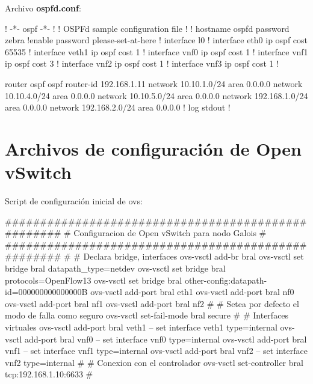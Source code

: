 \newpage
Archivo \textbf{ospfd.conf}:
\begin{bash}
! -*- ospf -*-
!
! OSPFd sample configuration file
!
!
hostname ospfd
password zebra
!enable password please-set-at-here
!
interface l0
!
interface eth0
  ip ospf cost 65535
!
interface veth1
 ip ospf cost 1
!
interface vnf0
  ip ospf cost 1
!
interface vnf1
  ip ospf cost 3
!
interface vnf2
  ip ospf cost 1
!
interface vnf3
  ip ospf cost 1
!

router ospf
 ospf router-id 192.168.1.11
 network 10.10.1.0/24 area 0.0.0.0
 network 10.10.4.0/24 area 0.0.0.0
 network 10.10.5.0/24 area 0.0.0.0
 network 192.168.1.0/24 area 0.0.0.0
 network 192.168.2.0/24 area 0.0.0.0
!
log stdout
!
\end{bash}

\newpage
\section{Archivos de configuraci\'on de Open vSwitch}

Script de configuraci\'on inicial de ovs:

\begin{bash}
###################################################
# Configuracion de Open vSwitch para nodo Galois  #
###################################################
#
# Declara bridge, interfaces
ovs-vsctl add-br bral
ovs-vsctl set bridge bral datapath_type=netdev
ovs-vsctl set bridge bral protocols=OpenFlow13
ovs-vsctl set bridge bral other-config:datapath-id=000000000000000B
ovs-vsctl add-port bral eth1
ovs-vsctl add-port bral nf0
ovs-vsctl add-port bral nf1
ovs-vsctl add-port bral nf2
#
# Setea por defecto el modo de falla como seguro
ovs-vsctl set-fail-mode bral secure
#
# Interfaces virtuales
ovs-vsctl add-port bral veth1 
-- set interface veth1 type=internal
ovs-vsctl add-port bral vnf0 
-- set interface vnf0 type=internal
ovs-vsctl add-port bral vnf1 
-- set interface vnf1 type=internal
ovs-vsctl add-port bral vnf2 
-- set interface vnf2 type=internal
#
# Conexion con el controlador
ovs-vsctl set-controller bral tcp:192.168.1.10:6633
#
\end{bash}



